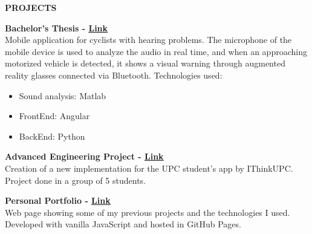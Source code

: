 \documentclass[../main.tex]{subfiles}
\begin{document}
    \textbf{\textcolor{myCV2}{PROJECTS\underline{\hspace{15.8cm}}}}
    \vspace*{0.3cm}
    
    \textbf{Bachelor's Thesis - 
        \hspace*{0.07cm}
        \textcolor{myCV2}{
        \vspace*{0.1cm}\underline{\href{https://www.youtube.com/watch?v=WKyUsdZbQ0Y}{Link}}}}\\
        Mobile application for cyclists with hearing problems. The microphone of the mobile device is used to analyze the audio in real time, and when an approaching motorized vehicle is detected, it shows a visual warning through augmented reality glasses connected via Bluetooth. Technologies used:

        \begin{itemize}
            \vspace*{-0.2cm}
            \item Sound analysis: Matlab
            \vspace*{-0.2cm}
            \item FrontEnd: Angular
            \vspace*{-0.2cm}
            \item BackEnd: Python
        \end {itemize}
        
        \textbf{Advanced Engineering Project - 
         \hspace*{0.07cm}
         \textcolor{myCV2}{
        \vspace*{0.1cm}\underline{\href{https://www.youtube.com/watch?v=RrfiOulhY-E&t=7s}{Link}}}}\\
        Creation of a new implementation for the UPC student's app by IThinkUPC. Project done in a group of 5 students.

        \vspace*{0.25cm}
        \textbf{Personal Portfolio - 
         \hspace*{0.07cm}
         \textcolor{myCV2}{
        \vspace*{0.1cm}\underline{\href{https://albatalaya.github.io/}{Link}}}}\\
        Web page showing some of my previous projects and the technologies I used. Developed with vanilla JavaScript and hosted in GitHub Pages.
\end{document}

